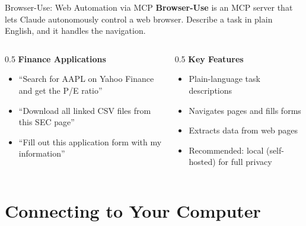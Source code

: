 \documentclass[aspectratio=169]{beamer}
\begin{document}
\begin{frame}{Browser-Use: Web Automation via MCP}
\textbf{Browser-Use} is an MCP server that lets Claude autonomously control a web browser. Describe a task in plain English, and it handles the navigation.
\vspace{0.3cm}
\begin{columns}[T]
\begin{column}{0.5\textwidth}
\textbf{Finance Applications}
\begin{itemize}\small
  \item ``Search for AAPL on Yahoo Finance and get the P/E ratio''
  \item ``Download all linked CSV files from this SEC page''
  \item ``Fill out this application form with my information''
\end{itemize}
\end{column}
\begin{column}{0.5\textwidth}
\textbf{Key Features}
\begin{itemize}\small
  \item Plain-language task descriptions
  \item Navigates pages and fills forms
  \item Extracts data from web pages
  \item \alert{Recommended}: local (self-hosted) for full privacy
\end{itemize}
\end{column}
\end{columns}
\end{frame}

\section{Connecting to Your Computer}
\end{document}
